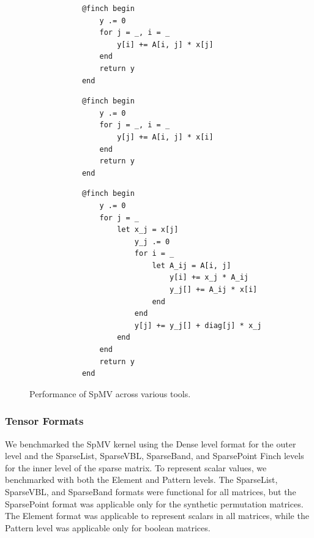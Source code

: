 \documentclass[acmsmall]{acmart}
\begin{document}
\begin{figure}
    \begin{minipage}[t]{0.315\textwidth}
        \vspace{0pt} %
        \begin{verbatim}
            @finch begin
                y .= 0
                for j = _, i = _
                    y[i] += A[i, j] * x[j]
                end
                return y
            end
        \end{verbatim}
    \end{minipage}%
    \begin{minipage}[t]{0.315\textwidth}
        \vspace{0pt} %
        \begin{verbatim}
            @finch begin
                y .= 0
                for j = _, i = _
                    y[j] += A[i, j] * x[i]
                end
                return y
            end
        \end{verbatim}
    \end{minipage}
    \begin{minipage}[t]{0.36\textwidth}
        \vspace{0pt} %
        \begin{verbatim}
            @finch begin
                y .= 0
                for j = _
                    let x_j = x[j]
                        y_j .= 0
                        for i = _
                            let A_ij = A[i, j]
                                y[i] += x_j * A_ij
                                y_j[] += A_ij * x[i]
                            end
                        end
                        y[j] += y_j[] + diag[j] * x_j
                    end
                end
                return y
            end
        \end{verbatim}
    \end{minipage}
    \caption{Performance of SpMV across various tools.}
\end{figure}

\subsubsection{Tensor Formats}
We benchmarked the SpMV kernel using the Dense level format for the outer level and the SparseList, SparseVBL, SparseBand, and SparsePoint Finch levels for the inner level of the sparse matrix. To represent scalar values, we benchmarked with both the Element and Pattern levels. The SparseList, SparseVBL, and SparseBand formats were functional for all matrices, but the SparsePoint format was applicable only for the synthetic permutation matrices. The Element format was applicable to represent scalars in all matrices, while the Pattern level was applicable only for boolean matrices. 
\end{document}

